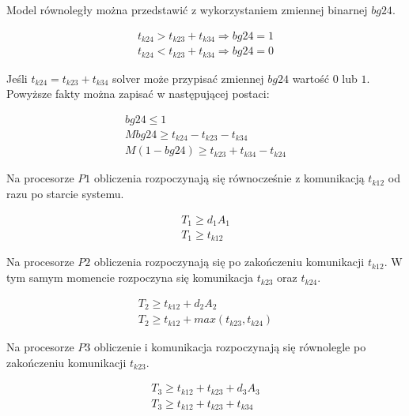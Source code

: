 Model równoległy można przedstawić z wykorzystaniem zmiennej binarnej $bg24$.

\begin{equation} \label{eq:bg24}
\begin{array}{l}
t_{k24} > t_{k23} + t_{k34} \Rightarrow bg24 = 1 \\
t_{k24} < t_{k23} + t_{k34} \Rightarrow bg24 = 0
\end{array}
\end{equation}

Jeśli $t_{k24} = t_{k23} + t_{k34}$ solver może przypisać zmiennej $bg24$ wartość $0$ lub $1$.
Powyższe fakty można zapisać w następującej postaci:

\begin{equation}
\begin{array}{l}
bg24 \leq 1 \\
Mbg24 \geq t_{k24} - t_{k23} - t_{k34} \\
M(1 - bg24) \geq t_{k23} + t_{k34} - t_{k24}
\end{array}
\end{equation}

Na procesorze $P1$ obliczenia rozpoczynają się równocześnie z komunikacją $t_{k12}$ od razu po starcie systemu.

\begin{equation}
\begin{array}{l}
T_{1} \geq d_{1}A_{1} \\
T_{1} \geq t_{k12}
\end{array}
\end{equation}

Na procesorze $P2$ obliczenia rozpoczynają się po zakończeniu komunikacji $t_{k12}$.
W tym samym momencie rozpoczyna się komunikacja $t_{k23}$ oraz $t_{k24}$.

\begin{equation}
\begin{array}{l}
T_{2} \geq t_{k12} + d_{2}A_{2} \\
T_{2} \geq t_{k12} + max(t_{k23}, t_{k24})
\end{array}
\end{equation}

Na procesorze $P3$ obliczenie i komunikacja rozpoczynają się równolegle po zakończeniu komunikacji $t_{k23}$.

\begin{equation}
\begin{array}{l}
T_{3} \geq t_{k12} + t_{k23} + d_{3}A_{3} \\
T_{3} \geq t_{k12} + t_{k23} + t_{k34}
\end{array}
\end{equation}

